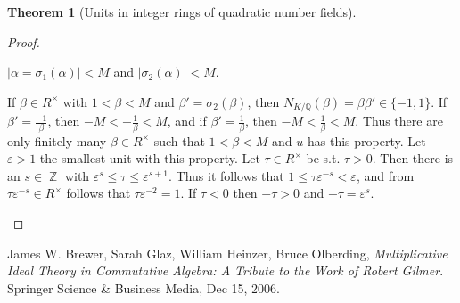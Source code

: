 \documentclass[12pt,a4paper]{report}
\theoremstyle{definition}
\newtheorem{theorem}{Theorem}[chapter] %
\theoremstyle{num.custom-title}
\DeclareMathOperator{\Z}{\mathbb{Z}}
\newcommand{\Q}{\mathbb{Q}}
\renewcommand{\epsilon}{\varepsilon}
\begin{document}
\begin{theorem}[Units in integer rings of quadratic number fields]
\begin{proof}
\begin{enumerate}
\begin{center}
$|\alpha = \sigma_1(\alpha)|<M$ and $|\sigma_2(\alpha)|<M$.
\end{center}
If $\beta \in R^\times$ with $1<\beta<M$ and $\beta' = \sigma_2(\beta)$, then $N_{K/\Q}(\beta) = \beta \beta' \in \{-1,1\}$. If $\beta' = \frac{-1}{\beta}$, then $-M < -\frac{1}{\beta} < M$, and if $\beta' = \frac{1}{\beta}$, then $-M < \frac{1}{\beta} < M$. Thus there are only finitely many $\beta \in R^\times$ such that $1<\beta<M$ and $u$ has this property. Let $\epsilon>1$ the smallest unit with this property. Let $\tau \in R^\times$ be s.t. $\tau>0$. Then there is an $s \in \Z$ with $\epsilon^s \leq \tau \leq \epsilon^{s+1}$. Thus it follows that $1 \leq \tau \epsilon^{-s} < \epsilon$, and from $\tau \epsilon^{-s} \in R^\times$ follows that $\tau \epsilon^{-2} = 1$. If $\tau<0$ then $-\tau>0$ and $-\tau = \epsilon^s$.
\end{enumerate}
\end{proof}
\end{theorem}

\begin{thebibliography}{9}

James W. Brewer, Sarah Glaz, William Heinzer, Bruce Olberding, \emph{Multiplicative Ideal Theory in Commutative Algebra: A Tribute to the Work of Robert Gilmer}. Springer Science \& Business Media, Dec 15, 2006.

\end{thebibliography}
\end{document}
